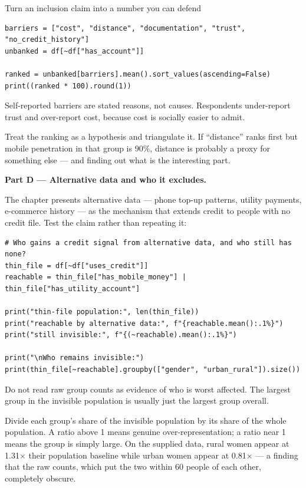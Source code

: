 \begin{labproject}{Turn an inclusion claim into a number you can defend}
\begin{lstlisting}[style=utppython]
barriers = ["cost", "distance", "documentation", "trust", "no_credit_history"]
unbanked = df[~df["has_account"]]

ranked = unbanked[barriers].mean().sort_values(ascending=False)
print((ranked * 100).round(1))
\end{lstlisting}

\begin{pitfall}
Self-reported barriers are stated reasons, not causes. Respondents under-report trust and over-report cost, because cost is socially easier to admit.

Treat the ranking as a hypothesis and triangulate it. If ``distance'' ranks first but mobile penetration in that group is 90\%, distance is probably a proxy for something else --- and finding out what is the interesting part.
\end{pitfall}

\medskip\noindent\textbf{Part D --- Alternative data and who it excludes.}\par
The chapter presents alternative data --- phone top-up patterns, utility payments, e-commerce history --- as the mechanism that extends credit to people with no credit file. Test the claim rather than repeating it:

\begin{lstlisting}[style=utppython]
# Who gains a credit signal from alternative data, and who still has none?
thin_file = df[~df["uses_credit"]]
reachable = thin_file["has_mobile_money"] | thin_file["has_utility_account"]

print("thin-file population:", len(thin_file))
print("reachable by alternative data:", f"{reachable.mean():.1%}")
print("still invisible:", f"{(~reachable).mean():.1%}")

print("\nWho remains invisible:")
print(thin_file[~reachable].groupby(["gender", "urban_rural"]).size())
\end{lstlisting}

\begin{pitfall}
Do not read raw group counts as evidence of who is worst affected. The largest group in the invisible population is usually just the largest group overall.

Divide each group's share of the invisible population by its share of the whole population. A ratio above 1 means genuine over-representation; a ratio near 1 means the group is simply large. On the supplied data, rural women appear at 1.31$\times$ their population baseline while urban women appear at 0.81$\times$ --- a finding that the raw counts, which put the two within 60 people of each other, completely obscure.
\end{pitfall}


\end{labproject}
